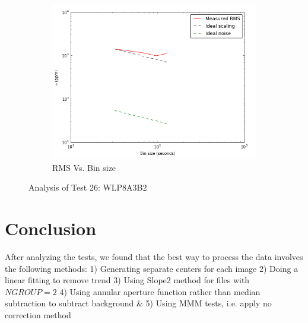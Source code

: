 \documentclass{aastex6}
\begin{document}
\begin{figure}[H]
    \begin{subfigure}{3}
        \includegraphics[scale=0.6]{rms_test26}
        \caption{RMS Vs. Bin size}
    \end{subfigure}
    \caption{Analysis of Test 26: WLP8A3B2}
\end{figure}



\section{Conclusion}
After analyzing the tests, we found that the best way to process the data involves the following methods: 1) Generating separate centers for each image 2) Doing a linear fitting to remove trend 3) Using Slope2 method for files with $NGROUP = 2$ 4) Using annular aperture function rather than median subtraction to subtract background \& 5) Using MMM tests, i.e. apply no correction method  


\end{document}
